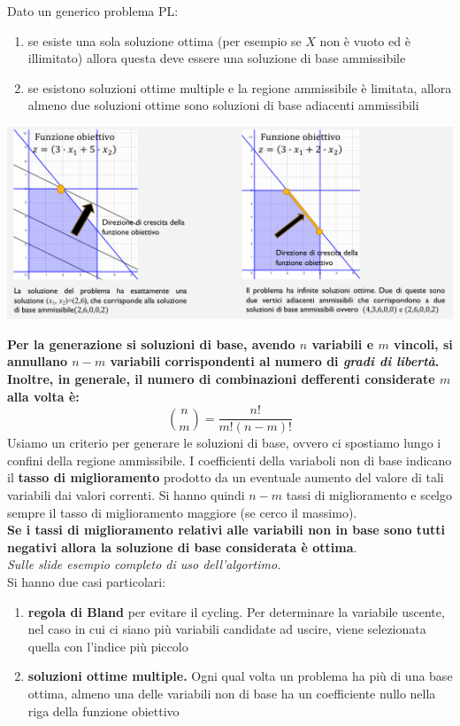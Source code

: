 \documentclass[a4paper,12pt, oneside]{book}
\begin{document}
\begin{teorema}
  Dato un generico problema PL:
  \begin{enumerate}
    \item se esiste una sola soluzione ottima (per esempio se $X$ non
    è vuoto ed è illimitato) allora questa deve essere una soluzione
    di base ammissibile
    \item se esistono soluzioni ottime multiple e la regione
    ammissibile è limitata, allora almeno due soluzioni ottime sono
    soluzioni di base adiacenti ammissibili
  \end{enumerate}
  \begin{center}
    \includegraphics[scale = 1]{img/simp23.png}
  \end{center}
\end{teorema}
\textbf{Per la generazione si soluzioni di base, avendo $n$ variabili e $m$
  vincoli, si annullano $n-m$ variabili corrispondenti al numero di
  \textit{gradi di libertà}. Inoltre, in generale, il numero di
  combinazioni defferenti considerate $m$ alla volta è:}
\[{n\choose m}=\frac{n!}{m!(n-m)!}\]
Usiamo un criterio per generare le soluzioni di base, ovvero ci
spostiamo lungo i confini della regione ammissibile. I coefficienti della
variaboli non di base indicano il \textbf{tasso di miglioramento}
prodotto da un eventuale aumento del valore di
tali variabili dai valori correnti. Si hanno quindi $n-m$ tassi di
miglioramento e scelgo sempre il tasso di miglioramento maggiore (se
cerco il massimo).\\
\textbf{Se i tassi di miglioramento relativi alle variabili non in
  base sono tutti negativi allora la soluzione di base considerata
  è ottima}.\\
\textit{Sulle slide esempio completo di uso dell'algortimo.}\\
Si hanno due casi particolari:
\begin{enumerate}
  \item \textbf{regola di Bland} per evitare il cycling.
  Per determinare la variabile uscente, nel caso in cui ci siano
  più variabili candidate ad uscire, viene selezionata quella con
  l’indice più piccolo
  \item \textbf{soluzioni ottime multiple.} Ogni qual volta un
  problema ha più di una base ottima, almeno una delle variabili non
  di base ha un coefficiente nullo nella riga della funzione
  obiettivo
\end{enumerate}
\end{document}
